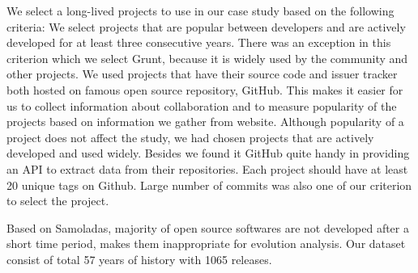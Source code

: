 We select a long-lived projects to use in our case study based on the following criteria:
We select projects that are popular between developers and are actively developed for at least three consecutive years. There was an exception in this criterion which we select Grunt, because it is widely used by the community and other projects.
	We used projects that have their source code and issuer tracker both hosted on famous open source repository, GitHub. This makes it easier for us to collect information about collaboration and to measure popularity of the projects based on information we gather from website. Although popularity of a project does not affect the study, we had chosen projects that are actively developed and used widely. Besides we found it GitHub quite handy in providing an API to extract data from their repositories.
	Each project should have at least 20 unique tags on Github.
	Large number of commits was also one of our criterion to select the project.

Based on Samoladas\cite{Samoladas2010SAD}, majority of open source softwares are not developed after a short time period, makes them inappropriate for evolution analysis. Our dataset consist of total 
57 years of history with 1065 releases. 

